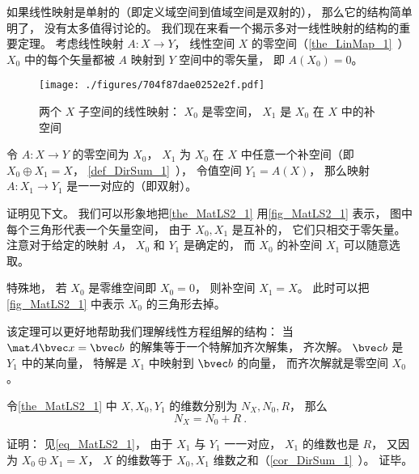 
\begin{issues}
\issueTODO %
\end{issues}



如果线性映射是单射的（即定义域空间到值域空间是双射的）， 那么它的结构简单明了， 没有太多值得讨论的。 我们现在来看一个揭示多对一线性映射的结构的重要定理。 考虑线性映射 $A:X\to Y$， 线性空间 $X$ 的零空间（\autoref{the_LinMap_1}~） $X_0$ 中的每个矢量都被 $A$ 映射到 $Y$ 空间中的零矢量， 即 $A(X_0) = \qty{0}$。

\begin{figure}[ht]
\centering
\texttt{[image: ./figures/704f87dae0252e2f.pdf]}
\caption{两个 $X$ 子空间的线性映射： $X_0$ 是零空间， $X_1$ 是 $X_0$ 在 $X$ 中的补空间} \label{fig_MatLS2_1}
\end{figure}

\begin{theorem}{}\label{the_MatLS2_1}
令 $A:X \to Y$ 的零空间为 $X_0$， $X_1$ 为 $X_0$ 在 $X$ 中任意一个补空间（即 $X_0\oplus X_1 = X$， \autoref{def_DirSum_1}~）， 令值空间 $Y_1 = A(X)$， 那么映射 $A:X_1\to Y_1$ 是一一对应的（即双射）。
\end{theorem}
证明见下文。 我们可以形象地把\autoref{the_MatLS2_1} 用\autoref{fig_MatLS2_1} 表示， 图中每个三角形代表一个矢量空间， 由于 $X_0, X_1$ 是互补的， 它们只相交于零矢量。 注意对于给定的映射 $A$， $X_0$ 和 $Y_1$ 是确定的， 而 $X_0$ 的补空间 $X_1$ 可以随意选取。

特殊地， 若 $X_0$ 是零维空间即 $X_0 = \qty{0}$， 则补空间 $X_1 = X$。 此时可以把\autoref{fig_MatLS2_1} 中表示 $X_0$ 的三角形去掉。

该定理可以更好地帮助我们理解线性方程组解的结构： 当 $\mat A \bvec x = \bvec b$ 的解集等于一个特解加齐次解集， 齐次解。 $\bvec b$ 是 $Y_1$ 中的某向量， 特解是 $X_1$ 中映射到 $\bvec b$ 的向量， 而齐次解就是零空间 $X_0$。

\begin{corollary}{}\label{cor_MatLS2_1}
令\autoref{the_MatLS2_1} 中 $X, X_0, Y_1$ 的维数分别为 $N_X, N_0, R$， 那么
\begin{equation}\label{eq_MatLS2_1}
N_X = N_0 + R~.
\end{equation}
\end{corollary}
证明： 见\autoref{eq_MatLS2_1}， 由于 $X_1$ 与 $Y_1$ 一一对应， $X_1$ 的维数也是 $R$， 又因为 $X_0\oplus X_1 = X$， $X$ 的维数等于 $X_0, X_1$ 维数之和（\autoref{cor_DirSum_1}~）。 证毕。

